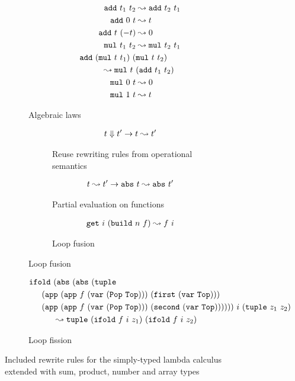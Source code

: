 \begin{figure}[]
  \centering
  \begin{subfigure}{0.48\textwidth}
    \centering
    \begin{align*}
      \texttt{add}\ t_1\ t_2 &\leadsto \texttt{add}\ t_2\ t_1 \\
      \texttt{add}\ 0\ t &\leadsto t \\
      \texttt{add}\ t\ (-t) &\leadsto 0 \\
      \texttt{mul}\ t_1\ t_2 &\leadsto \texttt{mul}\ t_2\ t_1 \\
      \texttt{add}\ (\texttt{mul}\ t\ t_1)\ (&\texttt{mul}\ t\ t_2) \\
        \leadsto \texttt{mul}\ t\ &(\texttt{add}\ t_1\ t_2) \\
      \texttt{mul}\ 0\ t &\leadsto 0 \\
      \texttt{mul}\ 1\ t &\leadsto t
    \end{align*}
    \caption{Algebraic laws}
  \end{subfigure}
  \begin{subfigure}{0.48\textwidth}
    \begin{subfigure}{1\textwidth}
      \begin{align*}
        t \Downarrow t' \to t \leadsto t'
      \end{align*}
      \caption{Reuse rewriting rules from operational semantics}
    \end{subfigure}
    \begin{subfigure}{1\textwidth}
      \begin{align*}
        t \leadsto t' \to \texttt{abs}\ t \leadsto \texttt{abs}\ t'
      \end{align*}
      \caption{Partial evaluation on functions}
    \end{subfigure}
    \begin{subfigure}{1\textwidth}
      \begin{align*}
        \texttt{get}\ i\ (\texttt{build}\ n\ f)\leadsto f\ i
      \end{align*}
      \caption{Loop fusion}
    \end{subfigure}
  \end{subfigure}
  \begin{subfigure}{1\textwidth}
    \begin{align*}
      \ifold{
        &(\abs{(\abs{
          (\tuple
          {\\&\hspace{-0.5cm}(\app{(\app{f}{(\var{(\Pop{\Top}))}})}
              {(\first{(\var{\Top})})})}
          {\\&\hspace{-0.5cm}(\app{(\app{f}{(\var{(\Pop{\Top}))}})}
              {(\second{(\var{\Top})})})})})})}
        {i}{(\tuple{z_1}{z_2})} \\
        & \leadsto \tuple{(\ifold{f}{i}{z_1})}{(\ifold{f}{i}{z_2})}
    \end{align*}
    \caption{Loop fission}
  \end{subfigure}
  \caption{Included rewrite rules for the simply-typed lambda calculus extended with sum, product, number and array types}
  \label{fig:rewrite_rules}
\end{figure}

